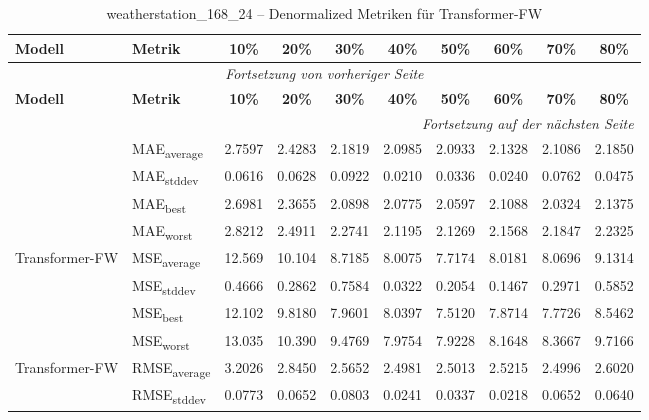 {\small
\begin{longtable}{l l c c c c c c c c}
    \toprule
    \textbf{Modell} & \textbf{Metrik} & \textbf{10\%} & \textbf{20\%} & \textbf{30\%} & \textbf{40\%} & \textbf{50\%} & \textbf{60\%} & \textbf{70\%} & \textbf{80\%} \\
    \midrule
    \endfirsthead
    \multicolumn{10}{c}{\textit{Fortsetzung von vorheriger Seite}} \\
    \toprule
    \textbf{Modell} & \textbf{Metrik} & \textbf{10\%} & \textbf{20\%} & \textbf{30\%} & \textbf{40\%} & \textbf{50\%} & \textbf{60\%} & \textbf{70\%} & \textbf{80\%} \\
    \midrule
    \endhead
    \midrule
    \multicolumn{10}{r}{\textit{Fortsetzung auf der nächsten Seite}} \\
    \midrule
    \endfoot
    \bottomrule
    \caption{weatherstation_168_24 -- Denormalized Metriken für Transformer-FW}
    \label{tab:weatherstation_168_24_denormalized_transformer-fw}
    \endlastfoot
\multirow{4}{*}{Transformer-FW} & MAE\textsubscript{average} & 2.7597 & 2.4283 & 2.1819 & 2.0985 & 2.0933 & 2.1328 & 2.1086 & 2.1850 \\
 & MAE\textsubscript{stddev} & 0.0616 & 0.0628 & 0.0922 & 0.0210 & 0.0336 & 0.0240 & 0.0762 & 0.0475 \\
 & MAE\textsubscript{best} & 2.6981 & 2.3655 & 2.0898 & 2.0775 & 2.0597 & 2.1088 & 2.0324 & 2.1375 \\
 & MAE\textsubscript{worst} & 2.8212 & 2.4911 & 2.2741 & 2.1195 & 2.1269 & 2.1568 & 2.1847 & 2.2325 \\
\cmidrule(lr){2-10}
\multirow{4}{*}{Transformer-FW} & MSE\textsubscript{average} & 12.569 & 10.104 & 8.7185 & 8.0075 & 7.7174 & 8.0181 & 8.0696 & 9.1314 \\
 & MSE\textsubscript{stddev} & 0.4666 & 0.2862 & 0.7584 & 0.0322 & 0.2054 & 0.1467 & 0.2971 & 0.5852 \\
 & MSE\textsubscript{best} & 12.102 & 9.8180 & 7.9601 & 8.0397 & 7.5120 & 7.8714 & 7.7726 & 8.5462 \\
 & MSE\textsubscript{worst} & 13.035 & 10.390 & 9.4769 & 7.9754 & 7.9228 & 8.1648 & 8.3667 & 9.7166 \\
\cmidrule(lr){2-10}
\multirow{4}{*}{Transformer-FW} & RMSE\textsubscript{average} & 3.2026 & 2.8450 & 2.5652 & 2.4981 & 2.5013 & 2.5215 & 2.4996 & 2.6020 \\
 & RMSE\textsubscript{stddev} & 0.0773 & 0.0652 & 0.0803 & 0.0241 & 0.0337 & 0.0218 & 0.0652 & 0.0640 \\

\end{longtable}}
